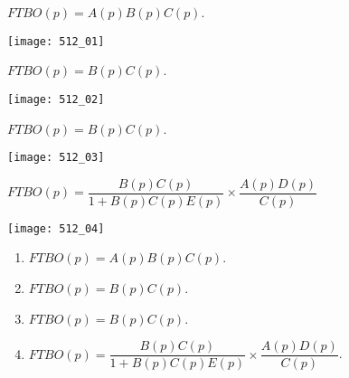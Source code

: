 \normaltrue \difficilefalse \tdifficilefalse
\correctionfalse


\setcounter{question}{0}%

\ifcorrection
\else
{}
\fi


\ifprof 
$FTBO(p) = A(p) B(p) C(p)$.
\else
\begin{marginfigure}
\texttt{[image: 512\_01]}
\end{marginfigure}
\fi
 

\ifprof 
$FTBO(p) = B(p) C(p)$.
\else
\begin{marginfigure}
\texttt{[image: 512\_02]}
\end{marginfigure}
\fi


\ifprof 
$FTBO(p) = B(p) C(p)$.
\else
\begin{marginfigure}
\texttt{[image: 512\_03]}
\end{marginfigure}
\fi


\ifprof 
$ FTBO(p) = \dfrac{B(p) C(p)}{1+B(p) C(p) E(p)} \times \dfrac{A(p) D(p)}{C(p)}$ 
\else
\begin{marginfigure}
\texttt{[image: 512\_04]}
\end{marginfigure}
\fi






\ifprof
\else
{}
\begin{solution}
\begin{enumerate}
\item $FTBO(p) = A(p) B(p) C(p)$.
\item $FTBO(p) = B(p) C(p)$.
\item $FTBO(p) = B(p) C(p)$.
\item $FTBO(p) = \dfrac{B(p) C(p)}{1+B(p) C(p) E(p)} \times \dfrac{A(p) D(p)}{C(p)}$.
\end{enumerate}
\end{solution}

\fi